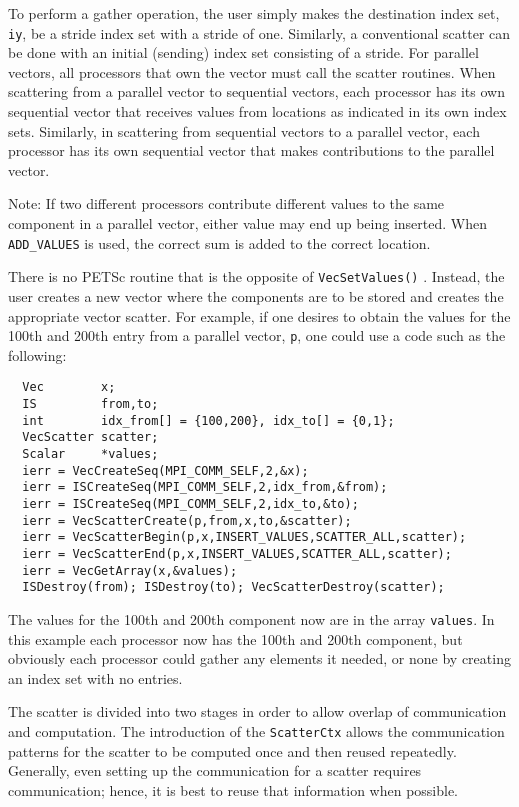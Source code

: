To perform a gather operation, the user simply makes
 the destination index set, 
{\tt iy}, be a stride index set with a stride of one.  Similarly, a 
conventional scatter can be done with an initial (sending) index set 
consisting of a stride.  For parallel vectors, all processors that own 
the vector must call the scatter routines. When scattering from a 
parallel vector to sequential vectors, each processor has its own sequential 
vector that receives values from locations as indicated in its own 
index sets. Similarly, in scattering
from sequential vectors to a parallel vector, each processor has its
own sequential vector that makes contributions to the parallel vector.

Note:  If two different processors contribute different values to the 
same component in a parallel vector, either value may end up being 
inserted. When {\tt ADD\_VALUES} is used, the correct sum is added to the 
correct location.

 
There is no PETSc routine that is the opposite of {\tt VecSetValues()}
.  Instead, the user creates a new vector where
the components are to be stored and creates the appropriate vector 
scatter. For example, if one desires to obtain the values for the 
100th and 200th entry from a parallel vector, {\tt p}, one could use 
a code such as the following:
\begin{verbatim}
  Vec        x;
  IS         from,to;
  int        idx_from[] = {100,200}, idx_to[] = {0,1};
  VecScatter scatter;
  Scalar     *values;
  ierr = VecCreateSeq(MPI_COMM_SELF,2,&x);
  ierr = ISCreateSeq(MPI_COMM_SELF,2,idx_from,&from);
  ierr = ISCreateSeq(MPI_COMM_SELF,2,idx_to,&to);
  ierr = VecScatterCreate(p,from,x,to,&scatter);
  ierr = VecScatterBegin(p,x,INSERT_VALUES,SCATTER_ALL,scatter);
  ierr = VecScatterEnd(p,x,INSERT_VALUES,SCATTER_ALL,scatter);
  ierr = VecGetArray(x,&values);
  ISDestroy(from); ISDestroy(to); VecScatterDestroy(scatter);
\end{verbatim}
The values for the 100th and 200th component now are in the array 
{\tt values}. In this example each processor now has the 100th and 
200th component, but obviously each processor could gather any 
elements it needed, or none by creating an index set with no entries.

The scatter is divided into two stages in order to allow overlap of 
communication and computation. The introduction of the 
{\tt ScatterCtx} allows the communication patterns for the scatter
to be computed once and then reused repeatedly. Generally, even 
setting up the communication for a scatter requires communication; 
hence, it is best to reuse that information when possible.

